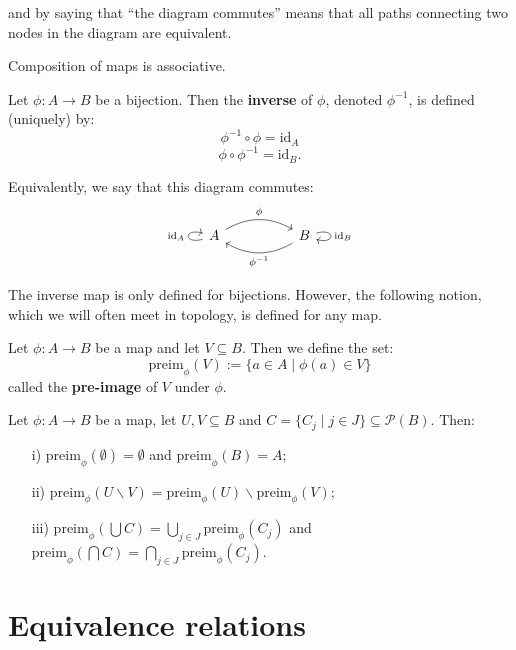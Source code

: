 \documentclass[root.tex]{subfiles}
\begin{document}
and by saying that ``the diagram commutes'' means that all paths connecting two nodes in the diagram are equivalent. 


\begin{proposition}
Composition of maps is associative.
\end{proposition}

\begin{mydef}
Let $\phi : A \to B$ be a bijection. Then the \textbf{inverse} of $\phi$, denoted $\phi^{-1}$, is defined (uniquely) by:
$$
\phi^{-1}\circ\phi = \text{id}_A
$$
$$
\phi\circ\phi^{-1} = \text{id}_B.
$$
\end{mydef}

Equivalently, we say that this diagram commutes: 
$$
\begin{tikzcd}
  A \arrow[loop left, "\text{id}_A"] \arrow[rr, bend left,"\phi"] & & B \arrow[loop right, "\text{id}_B"] \arrow[ll, bend left,"\phi^{-1}"]
\end{tikzcd}
$$

The inverse map is only defined for bijections. However, the following notion, which we will often meet in topology, is defined for any map.

\begin{mydef}
Let $\phi : A \to B$ be a map and let $V\subseteq B$. Then we define the set:
$$
\mathrm{preim}_\phi(V) := \{a \in A \mid \phi(a) \in V\}
$$
called the \textbf{pre-image} of $V$ under $\phi$.
\end{mydef}

\begin{proposition}
Let $\phi : A \to B$ be a map, let $U,V \subseteq B$ and $C=\{C_j \mid j \in J\} \subseteq \mathcal{P}(B)$. Then:
\begin{enumerate}
\item[i)] $\mathrm{preim}_\phi(\emptyset)=\emptyset$ and $\mathrm{preim}_\phi(B)=A$;
\item[ii)] $\mathrm{preim}_\phi(U\backslash V)=\mathrm{preim}_\phi(U)\backslash \mathrm{preim}_\phi(V)$;
\item[iii)] $\mathrm{preim}_\phi(\bigcup C)=\bigcup_{j \in J} \mathrm{preim}_\phi(C_j)$
 and $\mathrm{preim}_\phi(\bigcap C)=\bigcap_{j \in J} \mathrm{preim}_\phi(C_j)$.
 \end{enumerate}
\end{proposition}

\section{Equivalence relations}
\end{document}
